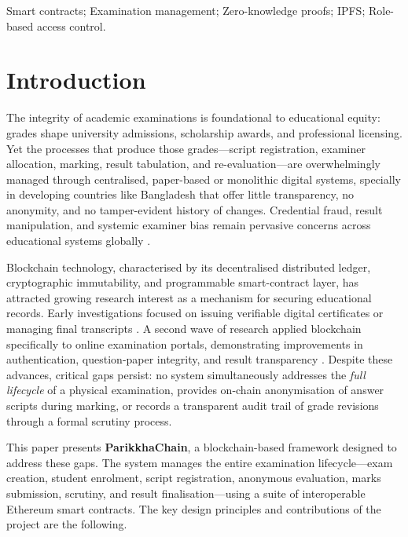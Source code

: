 \documentclass[conference]{IEEEtran}
\begin{document}
\begin{IEEEkeywords}
Smart contracts; Examination management;
Zero-knowledge proofs; IPFS; Role-based access control.
\end{IEEEkeywords}

\section{Introduction}

The integrity of academic examinations is foundational to educational equity: grades shape university admissions, scholarship awards, and
professional licensing.  Yet the processes that produce those grades---script
registration, examiner allocation, marking, result tabulation, and
re-evaluation---are overwhelmingly managed through centralised, paper-based
or monolithic digital systems, specially in developing countries like Bangladesh that offer little transparency, no anonymity,
and no tamper-evident history of changes.  Credential fraud, result
manipulation, and systemic examiner bias remain pervasive concerns across
educational systems globally \cite{chinnasamy2025blockchain,shirke2025trustexaminator}.
 
Blockchain technology, characterised by its decentralised distributed
ledger, cryptographic immutability, and programmable smart-contract layer,
has attracted growing research interest as a mechanism for securing
educational records.  Early investigations focused on issuing verifiable
digital certificates \cite{hybrid2024maritime} or managing final transcripts
\cite{chinnasamy2025blockchain}.  A second wave of research applied blockchain
specifically to online examination portals, demonstrating improvements in
authentication, question-paper integrity, and result transparency
\cite{sattar2023advanced,shirke2025trustexaminator}.  Despite these
advances, critical gaps persist: no system simultaneously addresses the
\emph{full lifecycle} of a physical examination, provides on-chain
anonymisation of answer scripts during marking, or records a transparent
audit trail of grade revisions through a formal scrutiny process.
 
This paper presents \textbf{ParikkhaChain}, a blockchain-based framework
designed to address these gaps.  The system manages the entire examination
lifecycle---exam creation, student enrolment, script registration, anonymous
evaluation, marks submission, scrutiny, and result finalisation---using a
suite of interoperable Ethereum smart contracts. The key design principles and contributions of the project are the following.
 
\end{document}
